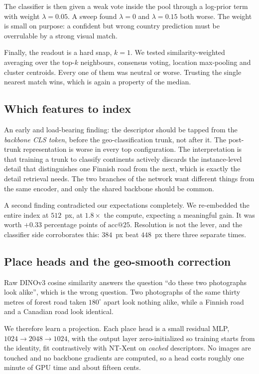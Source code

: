 \documentclass[11pt,a4paper]{article}
\begin{document}
The classifier is then given a weak vote inside the pool through a log-prior term with weight
$\lambda = 0.05$. A sweep found $\lambda = 0$ and $\lambda = 0.15$ both worse. The weight is
small on purpose: a confident but wrong country prediction must be overrulable by a strong
visual match.

Finally, the readout is a hard snap, $k = 1$. We tested similarity-weighted averaging over
the top-$k$ neighbours, consensus voting, location max-pooling and cluster centroids. Every
one of them was neutral or worse. Trusting the single nearest match wins, which is again a
property of the median.

\subsection{Which features to index}

An early and load-bearing finding: the descriptor should be tapped from the \emph{backbone
CLS token}, before the geo-classification trunk, not after it. The post-trunk representation
is worse in every top configuration. The interpretation is that training a trunk to classify
continents actively discards the instance-level detail that distinguishes one Finnish road
from the next, which is exactly the detail retrieval needs. The two branches of the network
want different things from the same encoder, and only the shared backbone should be common.

A second finding contradicted our expectations completely. We re-embedded the entire index at
$512$~px, at $1.8\times$ the compute, expecting a meaningful gain. It was worth $+0.33$
percentage points of $\mathrm{acc@}25$. Resolution is not the lever, and the classifier side
corroborates this: $384$~px beat $448$~px there three separate times.

\subsection{Place heads and the geo-smooth correction}

Raw DINOv3 cosine similarity answers the question ``do these two photographs look alike'',
which is the wrong question. Two photographs of the same thirty metres of forest road taken
$180^\circ$ apart look nothing alike, while a Finnish road and a Canadian road look
identical.

We therefore learn a projection. Each place head is a small residual MLP,
$1024 \rightarrow 2048 \rightarrow 1024$, with the output layer zero-initialized so training
starts from the identity, fit contrastively with NT-Xent \cite{chen2020simple,oord2018representation}
on \emph{cached} descriptors. No images are touched and no backbone gradients are computed,
so a head costs roughly one minute of GPU time and about fifteen cents.
\end{document}
